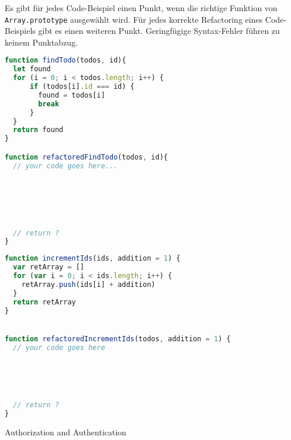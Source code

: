 \documentclass[
addpoints,a4paper,ngerman,answers
]{exam}
\begin{document}
\begin{questions}
\begin{parts}
  Es gibt für jedes Code-Beispiel einen Punkt, wenn die richtige Funktion von
  \texttt{Array.prototype} ausgewählt wird.
  Für jedes korrekte Refactoring eines Code-Beispiels gibt es einen weiteren
  Punkt. Geringfügige Syntax-Fehler führen zu keinem Punktabzug.
  \begin{subparts}
  \subpart[2]
\begin{lstlisting}[extendedchars=true,basicstyle=\ttfamily,language=JavaScript]
function findTodo(todos, id){
  let found
  for (i = 0; i < todos.length; i++) {
      if (todos[i].id === id) {
        found = todos[i]
        break
      }
  }
  return found
}

function refactoredFindTodo(todos, id){
  // your code goes here...






  // return ?
}
\end{lstlisting}
\newpage
\subpart[2]
\begin{lstlisting}[extendedchars=true,basicstyle=\ttfamily,language=JavaScript]
function incrementIds(ids, addition = 1) {
  var retArray = []
  for (var i = 0; i < ids.length; i++) {
    retArray.push(ids[i] + addition)
  }
  return retArray
}


function refactoredIncrementIds(todos, addition = 1) {
  // your code goes here





  // return ?
}
\end{lstlisting}
  \end{subparts}
\end{parts}


\question Authorization and Authentication
\end{questions}
\end{document}
